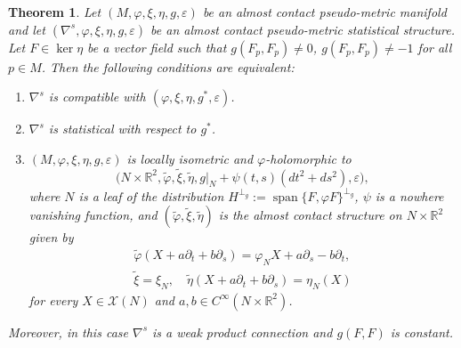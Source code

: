 \documentclass[12pt,a4paper,final]{amsart}
\numberwithin{equation}{section}
\newtheorem{tw}{Theorem}[section]
\theoremstyle{df}
\newcommand{\R}{\mathbb{R}}
\newcommand{\X}{\mathcal{X}}
\newcommand{\Span}{\operatorname{span}}
\newcommand{\eps}{\varepsilon}
\newcommand{\Cniesk}{{C^\infty}}
\begin{document}
\begin{tw}\label{tw::acstat}
Let $(M,\varphi,\xi,\eta,g,\eps)$ be an almost contact pseudo-metric manifold
and let $(\nabla^s,\varphi,\xi,\eta,g,\eps)$ be an almost contact pseudo-metric
statistical structure. Let $F\in\ker\eta$ be a vector field such that
$g(F_p,F_p)\neq 0$, $g(F_p,F_p)\neq -1$ for all $p\in M$.
Then the following conditions are equivalent:
\begin{enumerate}
\item $\nabla^s$ is compatible with $(\varphi,\xi,\eta,g^\ast,\eps)$.
\item $\nabla^s$ is statistical with respect to $g^\ast$.
\item $(M,\varphi,\xi,\eta,g,\eps)$ is locally isometric and $\varphi$-holomorphic to
$$
\bigl(N\times \R^2,\widetilde\varphi,\widetilde\xi,\widetilde\eta,g|_N+\psi(t,s)(dt^2+ds^2),\eps\bigr),
$$
where $N$ is a leaf of the distribution $H^{\perp_g}:=\Span\{F,\varphi F\}^{\perp_g}$,
$\psi$ is a nowhere vanishing function, and $(\widetilde\varphi,\widetilde\xi,\widetilde\eta)$ is the
almost contact structure on $N\times\R^2$ given by
\begin{align*}
\widetilde\varphi(X+a\partial_t+b\partial_s)=\varphi_NX+a\partial_s-b\partial_t, \\
\widetilde\xi=\xi_N,\quad \widetilde\eta(X+a\partial_t+b\partial_s)=\eta_N(X)
\end{align*}
for every $X\in\X(N)$ and $a,b\in\Cniesk(N\times\R^2)$.
\end{enumerate}
Moreover, in this case $\nabla^s$ is a weak product connection and $g(F,F)$ is constant.
\end{tw}
\end{document}
